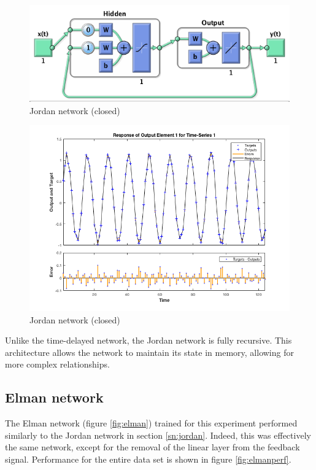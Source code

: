 \documentclass{IEEEtran}
\begin{document}
\begin{figure}[ht]
    \centering
    \includegraphics[width=\linewidth]{narx/closed_loop}
    \caption{Jordan network (closed) \label{fig:narxnet}}
\end{figure}

\begin{figure}[ht]
    \centering
    \includegraphics[width=\linewidth]{narx/closed_loop_full}
    \caption{Jordan network (closed) \label{fig:narxperf}}
\end{figure}

Unlike the time-delayed network, the Jordan network is fully recursive. This architecture allows the network to maintain its state in memory, allowing for more complex relationships.

\subsection{Elman network \label{sn:elman}}
The Elman network (figure \ref{fig:elman}) trained for this experiment performed similarly to the Jordan network in section \ref{sn:jordan}. Indeed, this was effectively the same network, except for the removal of the linear layer from the feedback signal. Performance for the entire data set is shown in figure \ref{fig:elmanperf}. 
\end{document}
